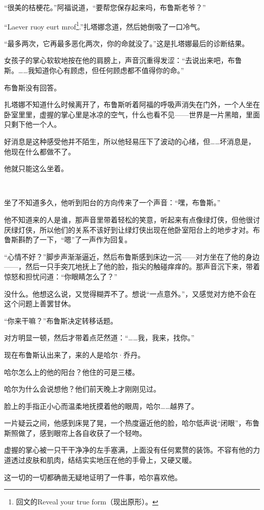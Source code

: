 \documentclass[../main.tex]{subfiles}
\begin{document}
“很美的桔梗花。”阿福说道，“要帮您保存起来吗，布鲁斯老爷？”

“Laever ruoy eurt mrof\footnote[1]{回文的Reveal your true form（现出原形）。}.”扎塔娜念道，然后她倒吸了一口冷气。

“最多两次，它再最多恶化两次，你的命就没了。”这是扎塔娜最后的诊断结果。

女孩子的掌心软软地按在他的肩膀上，声音沉重得发涩：“去说出来吧，布鲁斯。……我知道你心有顾虑，但任何顾虑都不值得你的命。”

布鲁斯没有回答。

扎塔娜不知道什么时候离开了，布鲁斯听着阿福的呼吸声消失在门外，一个人坐在卧室里里，虚握的掌心里是冰凉的空气，什么也看不见——世界是一片黑暗，里面只剩下他一个人。

好消息是这种感受他并不陌生，所以他轻易压下了波动的心绪，但……坏消息是，他现在什么都做不了。

他就只能这么坐着。

~\

坐了不知道多久，他听到阳台的方向传来了一个声音：“嘿，布鲁斯。”

他不知道来的人是谁，那声音里带着轻松的笑意，听起来有点像绿灯侠，但他很讨厌绿灯侠，所以他们的关系不该好到让绿灯侠出现在他卧室阳台上的地步才对。布鲁斯斟酌了一下，“嗯”了一声作为回复。

“心情不好？”脚步声渐渐逼近，然后布鲁斯感到床边一沉——对方坐在了他的身边——，然后一只手突兀地抚上了他的脸，指尖的触碰痒痒的。那声音沉下来，带着惊怒和担忧问道：“你眼睛怎么了？”

没什么。他想这么说，又觉得糊弄不了。想说“一点意外。”，又感觉对方绝不会在这个问题上善罢甘休。

“你来干嘛？”布鲁斯决定转移话题。

对方明显一顿，然后才带着点茫然道：“……我，我来，找你。”

现在布鲁斯认出来了，来的人是哈尔·乔丹。

哈尔怎么上的他的阳台？他住的可是三楼。

哈尔为什么会说想他？他们前天晚上才刚刚见过。

脸上的手指正小心而温柔地抚摸着他的眼周，哈尔……越界了。

一片疑云之间，他感到床晃了晃，一个热度逼近他的脸，哈尔低声说“闭眼”，布鲁斯照做了，感到眼帘上各自收获了一个轻吻。

虚握的掌心被一只干干净净的左手塞满，上面没有任何累赘的装饰。不容有他的力道透过皮肤和肌肉，结结实实地压在他的手骨上，又硬又暖。

这一切的一切都确凿无疑地证明了一件事，哈尔喜欢他。
\end{document}
